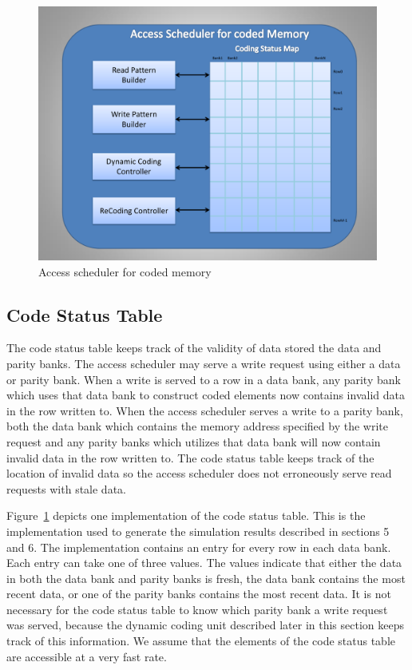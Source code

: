 \begin{figure}[tbp]
\centering
\includegraphics[width=0.7\linewidth]{fig/coded_access_scheduler.pdf}
\caption{
{Access scheduler for coded memory} }
\label{fig:coded_access_scheduler}
\end{figure}
\subsection{Code Status Table}
\label{sec:codeStatusTable}
The code status table keeps track of the validity of data stored the data and parity banks. The access scheduler may serve a write request using either a data or parity bank. When a write is served to a row in a data bank, any parity bank which uses that data bank to construct coded elements now contains invalid data in the row written to. When the access scheduler serves a write to a parity bank, both the data bank which contains the memory address specified by the write request and any parity banks which utilizes that data bank will now contain invalid data in the row written to. The code status table keeps track of the location of invalid data so the access scheduler does not erroneously serve read requests with stale data.

Figure~\ref{fig:coded_access_scheduler} depicts one implementation of the code status table. This is the implementation used to generate the simulation results described in sections 5 and 6. The implementation contains an entry for every row in each data bank. Each entry can take one of three values. The values indicate that either the data in both the data bank and parity banks is fresh, the data bank contains the most recent data, or one of the parity banks contains the most recent data. It is not necessary for the code status table to know which parity bank a write request was served, because the dynamic coding unit described later in this section keeps track of this information. We assume that the elements of the code status table are accessible at a very fast rate. 

